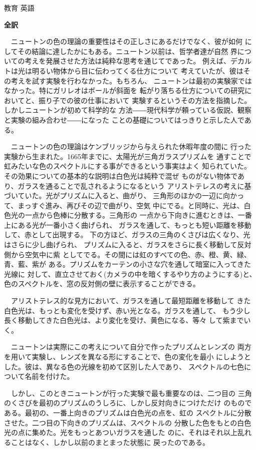 \documentclass[fleqn]{jbook}
\begin{document}
\begin{answer}{教育 英語}{}
\begin{subanswers}
\SubAnswer
  {\bf 全訳}

  　ニュートンの色の理論の重要性はその正しさにあるだけでなく、彼が如何
  にしてその結論に達したかにもある。ニュートン以前は、哲学者達が自然
  界についての考えを発展させた方法は純粋な思考を通じてであった。
  例えば、デカルトは光は明るい物体から目に伝わってくる仕方について
  考えていたが、彼はその考えを試す実験を行わなかった。もちろん、
  ニュートンは最初の実験家ではなかった。特にガリレオはボールが斜面を
  転がり落ちる仕方についての研究においてと、振り子での彼の仕事において
  実験するというその方法を指摘した。しかしニュートンが初めて科学的な
  方法――現代科学が頼っている仮説、観察と実験の組み合わせ――になった
  ことの基礎についてはっきりと示した人である。

  　ニュートンの色の理論はケンブリッジから与えられた休暇年度の間に
  行った実験から生まれた。1665年までに、太陽光が三角ガラスプリズムを
  通すことで虹みたいな色のスペクトルにする事ができるという事実はよく
  知られていた。その効果についての基本的な説明は白色光は純粋で混ぜ
  ものがない物体であり、ガラスを通ることで乱されるようになるという
  アリストテレスの考えに基づいていた。光がプリズムに入ると、曲がり、
  三角形のほかの一辺に向かって、まっすぐ進み、再びその辺で曲がり、空気
  中にでる。と同時に、光は、白色光の一点から色棒に分散する。三角形の
  一点から下向きに進むときは、一番上にある光が一番小さく曲げられ、
  ガラスを通して、もっとも短い距離を移動して、赤として出現する。
  下の方ほど、ガラスの三角のくさびは広くなり、光はさらに少し曲げられ、
  プリズムに入ると、ガラスをさらに長く移動して反対側から空気中に紫
  としてでる。その間には虹のすべての色、赤、橙、黄、緑、青、藍、紫が
  ある。プリズムをカーテンの小さな穴を通して暗室に入ってきた光線に
  対して、直立させておく(カメラの中を暗くするやり方のようにする)と、
  色のスペクトルを、窓の反対側の壁に表示することができる。

  　アリストテレス的な見方において、ガラスを通して最短距離を移動して
  きた白色光は、もっとも変化を受けず、赤い光となる。ガラスを通して、
  もう少し長く移動してきた白色光は、より変化を受け、黄色になる、等々
  して紫までいく。

  　ニュートンは実際にこの考えについて自分で作ったプリズムとレンズの
  両方を用いて実験し、レンズを異なる形にすることで、色の変化を最小
  にしようとした。彼は、異なる色の光線を初めて区別した人であり、
  スペクトルの七色について名前を付けた。

  　しかし、このときニュートンが行った実験で最も重要なのは、二つ目の
  三角のくさびを最初のプリズムのうしろに、しかし反対向きにつけただけ
  のものである。最初の、一番上向きのプリズムは白色光の点を、虹の
  スペクトルに分散させた。二つ目の下向きのプリズムは、スペクトルの
  分散した色をもとの白色光の点に集めた。光をもっとあついガラスを通した
  のに、それはそれ以上乱れることはなく、しかし以前のまとまった状態に
  戻ったのである。


\end{subanswers}
\end{answer}
\end{document}
